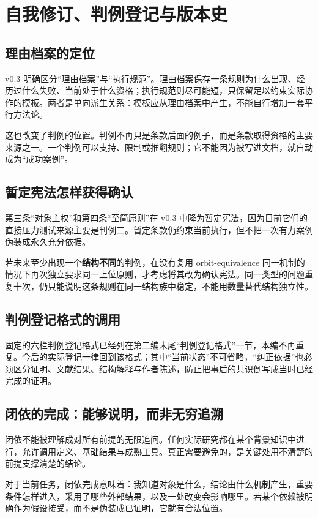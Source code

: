 \documentclass[UTF8,zihao=-4,fontset=none,oneside,openany]{ctexbook}
\begin{document}
\chapter{自我修订、判例登记与版本史}
\label{ch:revision}
\section{理由档案的定位}
v0.3 明确区分“理由档案”与“执行规范”。理由档案保存一条规则为什么出现、经历过什么失败、当前处于什么资格；执行规范则尽可能短，只保留足以约束实际协作的模板。两者是单向派生关系：模板应从理由档案中产生，不能自行增加一套平行方法论。

这也改变了判例的位置。判例不再只是条款后面的例子，而是条款取得资格的主要来源之一。一个判例可以支持、限制或推翻规则；它不能因为被写进文档，就自动成为“成功案例”。

\section{暂定宪法怎样获得确认}
第三条“对象主权”和第四条“至简原则”在 v0.3 中降为暂定宪法，因为目前它们的直接压力测试来源主要是判例二。暂定条款仍约束当前执行，但不把一次有力案例伪装成永久充分依据。

若未来至少出现一个\textbf{结构不同}的判例，在没有复用 orbit-equivalence 同一机制的情况下再次独立要求同一上位原则，才考虑将其改为确认宪法。同一类型的问题重复十次，仍只能说明这条规则在同一结构族中稳定，不能用数量替代结构独立性。

\section{判例登记格式的调用}
固定的六栏判例登记格式已经列在第二编末尾“判例登记格式”一节，本编不再重复。今后的实际登记一律回到该格式；其中“当前状态”不可省略，“纠正依据”也必须区分证明、文献结果、结构解释与作者陈述，防止把事后的共识倒写成当时已经完成的证明。

\section{闭依的完成：能够说明，而非无穷追溯}
闭依不能被理解成对所有前提的无限追问。任何实际研究都在某个背景知识中进行，允许调用定义、基础结果与成熟工具。真正需要避免的，是关键处用不清楚的前提支撑清楚的结论。

对于当前任务，闭依完成意味着：我知道对象是什么，结论由什么机制产生，重要条件怎样进入，采用了哪些外部结果，以及一处改变会影响哪里。若某个依赖被明确作为假设接受，而不是伪装成已证明，它就有合法位置。
\end{document}
